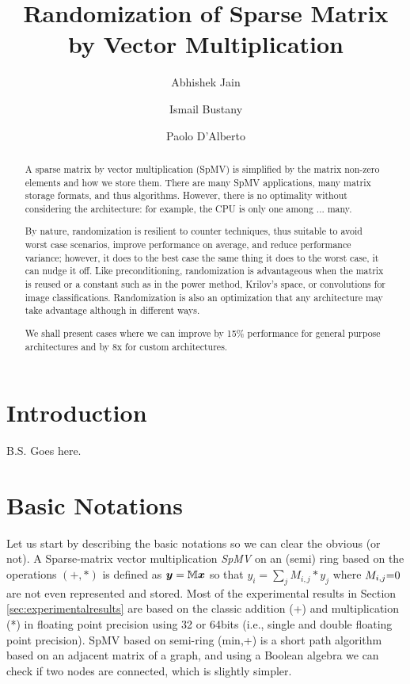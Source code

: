 \documentclass[manuscript,screen]{acmart}
\begin{document}
\title{Randomization of Sparse Matrix by Vector Multiplication }

\author{Abhishek Jain}
\author{Ismail Bustany}
\author{Paolo D'Alberto}


\renewcommand{\shortauthors}{Jain et al.}

\begin{abstract}
A sparse matrix by vector multiplication (SpMV) is simplified by the
matrix non-zero elements and how we store them. There are many SpMV
applications, many matrix storage formats, and thus
algorithms. However, there is no optimality without considering the
architecture: for example, the CPU is only one among ... many.

By nature, randomization is resilient to counter techniques, thus
suitable to avoid worst case scenarios, improve performance on
average, and reduce performance variance; however, it does to the best
case the same thing it does to the worst case, it can nudge it
off. Like preconditioning, randomization is advantageous when the
matrix is reused or a constant such as in the power method, Krilov's
space, or convolutions for image classifications.  Randomization is
also an optimization that any architecture may take advantage although
in different ways.

We shall present cases where we can improve by 15\% performance for
general purpose architectures and by 8x for custom architectures.

\end{abstract}

\maketitle

\section{Introduction} B.S. Goes here.
\label{sec:introduction}

\section{Basic Notations}
\label{sec:notations}
Let us start by describing the basic notations so we can clear the
obvious (or not).  A Sparse-matrix vector multiplication {\em SpMV} on
an (semi) ring based on the operations $(+,*)$ is defined as ${\boldsymbol y} =
\mathbb{M} {\boldsymbol x}$ so that $y_i = \sum_j M_{i,j}*y_j$ where $M_{i,j} {=} 0$
are not even represented and stored. Most of the experimental results
in Section \ref{sec:experimentalresults} are based on the classic
addition (+) and multiplication (*) in floating point precision using
32 or 64bits (i.e., single and double floating point precision).  SpMV
based on semi-ring (min,+) is a short path algorithm based on an
adjacent matrix of a graph, and using a Boolean algebra we can check
if two nodes are connected, which is slightly simpler. 
\end{document}
